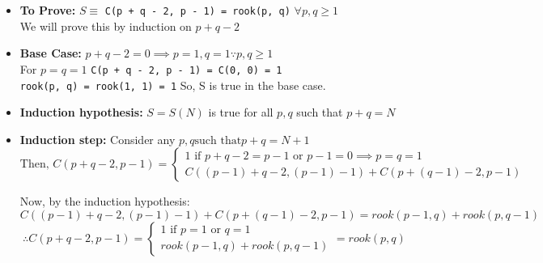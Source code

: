 \documentclass[answers]{exam}
\begin{document}
\begin{questions}
{\begin{parts}
{\begin{solution}
                    \begin{itemize}
                        \item {
                            \textbf{To Prove: } \(S \equiv\) \lstinline{C(p + q - 2, p - 1) = rook(p, q)} \(\forall p, q \geq 1\)\\
                            We will prove this by induction on \(p + q - 2\)
                        }
                        \item {
                            \textbf{Base Case: } \(p + q - 2 = 0 \implies p = 1, q = 1 \because p, q \geq 1\)\\
                            For \(p = q = 1\) \lstinline{C(p + q - 2, p - 1) = C(0, 0) = 1}\\
                            \lstinline{rook(p, q) = rook(1, 1) = 1}
                            So, S is true in the base case.
                        }
                        \item {
                            \textbf{Induction hypothesis: } \(S = S(N)\) is true for all \(p, q\) such that \(p + q = N\)
                        }
                        \item {
                            \textbf{Induction step: } Consider any \(p, q \text{such that} p + q = N + 1\)
                            \begin{equation*}
                                    \text{Then, } C(p + q - 2, p - 1) = \begin{cases}
                                        1 \text{ if } p + q - 2 = p - 1 \text{ or } p - 1 = 0 \implies p = q = 1\\
                                        C((p - 1) + q - 2, (p - 1) - 1) + C(p + (q - 1) - 2, p - 1)
                                    \end{cases}
                            \end{equation*}

                            Now, by the induction hypothesis:
                            \begin{equation*}
                                    C((p - 1) + q - 2, (p - 1) - 1) + C(p + (q - 1) - 2, p - 1) = rook(p - 1, q) + rook(p, q - 1)
                            \end{equation*}
                            \begin{equation*}
                                \therefore C(p + q - 2, p - 1) = \begin{cases}
                                    1 \text{ if } p = 1 \text{ or } q = 1\\
                                    rook(p - 1, q) + rook(p, q - 1)
                                \end{cases} = rook(p, q)
                            \end{equation*}

}
\end{itemize}
\end{solution}}
\end{parts}}
\end{questions}
\end{document}
